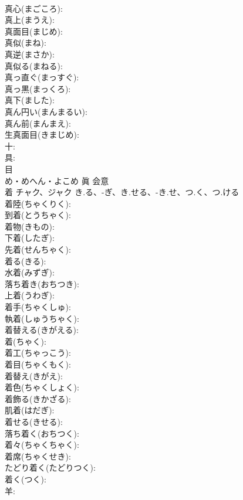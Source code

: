 \documentclass[8pt]{extreport}
\begin{document}
\begin{CJK}{UTF8}{min}
\\	真心(まごころ): 
\\	真上(まうえ): 
\\	真面目(まじめ): 
\\	真似(まね): 
\\	真逆(まさか): 
\\	真似る(まねる): 
\\	真っ直ぐ(まっすぐ): 
\\	真っ黒(まっくろ): 
\\	真下(ました): 
\\	真ん円い(まんまるい): 
\\	真ん前(まんまえ): 
\\	生真面目(きまじめ): 
\\	十: 
\\	具: 
\\	目	
\\	め・めへん・よこめ	眞	会意 
\\	着	チャク、ジャク	き.る、-ぎ、き.せる、-き.せ、つ.く、つ.ける		
\\	着陸(ちゃくりく): 
\\	到着(とうちゃく): 
\\	着物(きもの): 
\\	下着(したぎ): 
\\	先着(せんちゃく): 
\\	着る(きる): 
\\	水着(みずぎ): 
\\	落ち着き(おちつき): 
\\	上着(うわぎ): 
\\	着手(ちゃくしゅ): 
\\	執着(しゅうちゃく): 
\\	着替える(きがえる): 
\\	着(ちゃく): 
\\	着工(ちゃっこう): 
\\	着目(ちゃくもく): 
\\	着替え(きがえ): 
\\	着色(ちゃくしょく): 
\\	着飾る(きかざる): 
\\	肌着(はだぎ): 
\\	着せる(きせる): 
\\	落ち着く(おちつく): 
\\	着々(ちゃくちゃく): 
\\	着席(ちゃくせき): 
\\	たどり着く(たどりつく): 
\\	着く(つく): 
\\	羊: 

\end{CJK}
\end{document}
